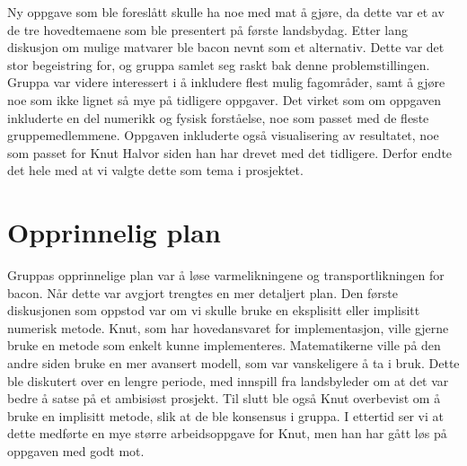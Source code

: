 Ny oppgave som ble foreslått skulle ha noe med mat å gjøre, da dette var et av
de tre hovedtemaene som ble presentert på første landsbydag. Etter lang
diskusjon om mulige matvarer ble bacon nevnt som et alternativ. Dette var det
stor begeistring for, og gruppa samlet seg raskt bak denne problemstillingen.
Gruppa var videre interessert i å inkludere flest mulig fagområder, samt å
gjøre noe som ikke lignet så mye på tidligere oppgaver. Det virket som om oppgaven inkluderte en del
numerikk og fysisk forståelse, noe som passet med de fleste gruppemedlemmene.
Oppgaven inkluderte også visualisering av resultatet, noe som passet for Knut
Halvor siden han har drevet med det tidligere. Derfor endte det hele
med at vi valgte dette som tema i prosjektet.



\section{Opprinnelig plan}
Gruppas opprinnelige plan var å løse varmelikningene og transportlikningen for
bacon. Når dette var avgjort trengtes en mer detaljert plan. Den første
diskusjonen som oppstod var om vi skulle bruke en eksplisitt eller implisitt
numerisk metode. Knut, som har hovedansvaret for implementasjon, ville gjerne
bruke en metode som enkelt kunne implementeres. Matematikerne ville
på den andre siden bruke en mer avansert modell, som var vanskeligere å ta i
bruk. Dette ble diskutert over en lengre periode, med innspill fra landsbyleder
om at det var bedre å satse på et ambisiøst prosjekt. Til slutt ble også Knut
overbevist om å bruke en implisitt metode, slik at de ble konsensus i gruppa. I
ettertid ser vi at dette medførte en mye større arbeidsoppgave for Knut, men han
har gått løs på oppgaven med godt mot. 


